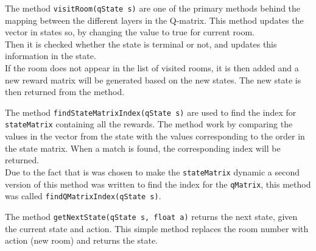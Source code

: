 \documentclass[../Head/Main.tex]{subfiles}
\begin{document}
The method \texttt{visitRoom(qState s)} are one of the primary methods behind the mapping between the different layers in the Q-matrix. This method updates the vector in states so, by changing the value to true for current room.\\
Then it is checked whether the state is terminal or not, and updates this information in the state.\\
If the room does not appear in the list of visited rooms, it is then added and a new reward matrix will be generated based on the new states. The new state is then returned from the method.\par 

The method \texttt{findStateMatrixIndex(qState s)} are used to find the index for \texttt{stateMatrix} containing all the rewards. The method work by comparing the values in the vector from the state with the values corresponding to the order in the state matrix. When a match is found, the corresponding index will be returned.\\
Due to the fact that is was chosen to make the \texttt{stateMatrix} dynamic a second version of this method was written to find the index for the \texttt{qMatrix}, this method was called \texttt{findQMatrixIndex(qState s)}.\par 

The method \texttt{getNextState(qState s, float a)} returns the next state, given the current state and action. This simple method replaces the room number with action (new room) and returns the state.\par 
\end{document}

